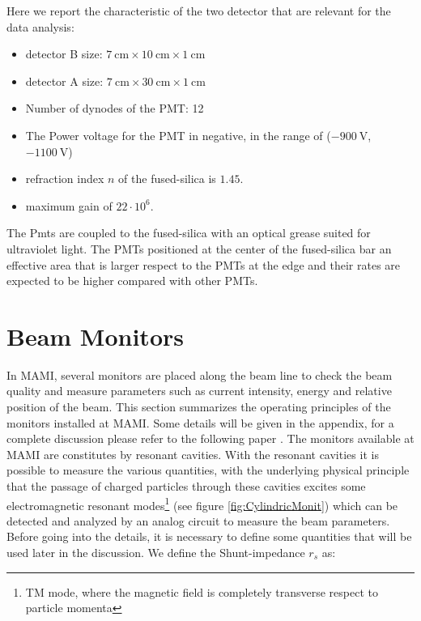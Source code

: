 Here we report the characteristic of the two detector that are relevant for the data analysis: 

\begin{itemize}
\item detector B size: $\SI{7}{\centi \meter} \times \SI{10}{\centi \meter} \times \SI{1}{\centi \meter}$
\item detector A size: $\SI{7}{\centi \meter} \times \SI{30}{\centi \meter} \times \SI{1}{\centi \meter}$
\item Number of dynodes of the PMT: 12
\item The Power voltage for the PMT in negative, in the range of ($\SI{-900}{\volt}$, $\SI{-1100}{\volt}$)
\item refraction index $n$ of the fused-silica is $1.45$.
\item maximum gain of $22 \cdot 10^{6}$.
\end{itemize}

The Pmts are coupled to the fused-silica with an optical grease suited for ultraviolet light. The PMTs positioned at the center of the fused-silica bar an effective area that is larger respect to the PMTs at the edge and their rates are expected to be higher compared with other PMTs. 

\section{Beam Monitors}

In MAMI, several monitors are placed along the beam line to check the beam quality and measure parameters such as current intensity, energy and relative position of the beam. This section summarizes the operating principles of the monitors installed at MAMI. Some details will be given in the appendix, for a complete discussion please refer to the following paper \cite{M_Dehn}.
The monitors available at MAMI are constitutes by resonant cavities. With the resonant cavities it is possible to measure the various quantities, with the underlying physical principle that the passage of charged particles through these cavities excites some electromagnetic resonant modes\footnote{TM mode, where the magnetic field is completely transverse respect to particle momenta} (see figure \ref{fig:CylindricMonit}) which can be detected and analyzed by an analog circuit to measure the beam parameters.
Before going into the details, it is necessary to define some quantities that will be used later in the discussion. We define the Shunt-impedance $r_{s}$ as:


